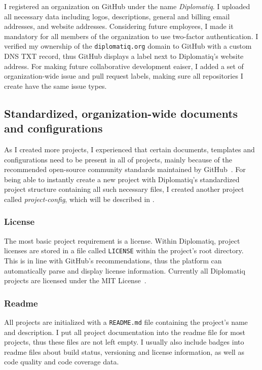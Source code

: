 I registered an organization on GitHub under the name \emph{Diplomatiq}. I uploaded all necessary data including logos, descriptions, general and billing email addresses, and website addresses. Considering future employees, I made it mandatory for all members of the organization to use two-factor authentication. I verified my ownership of the \lstinline{diplomatiq.org} domain to GitHub with a custom DNS TXT record, thus GitHub displays a  label next to Diplomatiq's website address. For making future collaborative development eaiser, I added a set of organization-wide issue and pull request labels, making sure all repositories I create have the same issue types.

\subsection{Standardized, organization-wide documents and configurations}

As I created more projects, I experienced that certain documents, templates and configurations need to be present in all of projects, mainly because of the recommended open-source community standards maintained by GitHub~\cite{opensource-guide}. For being able to instantly create a new project with Diplomatiq's standardized project structure containing all such necessary files, I created another project called \emph{project-config}, which will be described in .

\subsubsection{License}

The most basic project requirement is a license. Within Diplomatiq, project licenses are stored in a file called \lstinline{LICENSE} within the project's root directory. This is in line with GitHub's recommendations, thus the platform can automatically parse and display license information. Currently all Diplomatiq projects are licensed under the MIT License~\cite{mit-license}.

\subsubsection{Readme}

All projects are initialized with a \lstinline{README.md} file containing the project's name and description. I put all project documentation into the readme file for most projects, thus these files are not left empty. I usually also include badges into readme files about build status, versioning and license information, as well as code quality and code coverage data.


